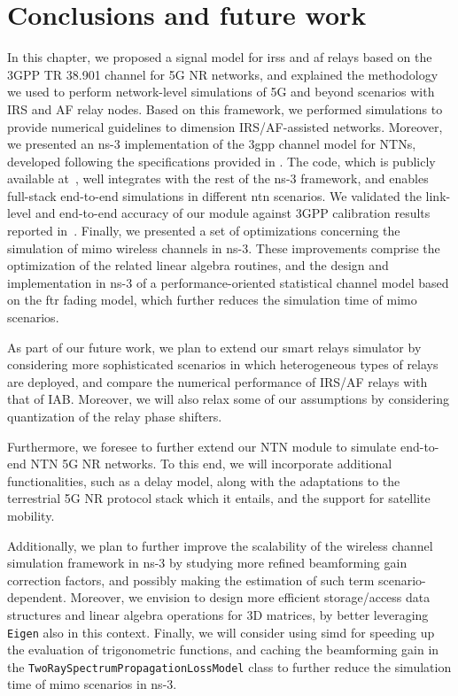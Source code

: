 \section{Conclusions and future work}
\label{sec:conc}

In this chapter, we proposed a signal model for \glspl{irs} and \gls{af} relays based on the 3GPP TR 38.901 channel for 5G NR networks, and explained the methodology we used to perform network-level simulations of 5G and beyond scenarios with IRS and AF relay nodes.
Based on this framework, we performed simulations to provide numerical guidelines to dimension IRS/AF-assisted networks. 
Moreover, we presented an ns-3 implementation of the \gls{3gpp} channel model for NTNs, developed following the specifications provided in \cite{38811}. The code, which is publicly available at~\cite{ntngitlab}, well integrates with the rest of the ns-3 framework, and enables full-stack end-to-end simulations in different \gls{ntn} scenarios. We validated the link-level and end-to-end accuracy of our module against 3GPP calibration results reported in~\cite{38821}. 
Finally, we presented a set of optimizations concerning the simulation of \gls{mimo} wireless channels in ns-3. These improvements comprise the optimization of the related linear algebra routines, and the design and implementation in ns-3 of a performance-oriented statistical channel model based on the \gls{ftr} fading model, which further reduces the simulation time of \gls{mimo} scenarios. %


As part of our future work, we plan to extend our smart relays simulator by considering more sophisticated
scenarios in which heterogeneous types of relays are deployed, and compare the numerical performance of
IRS/AF relays with that of IAB. Moreover, we will also relax some of our assumptions by considering quantization of the
relay phase shifters.

Furthermore, we foresee to further extend our NTN module to simulate end-to-end NTN 5G NR networks. To this end, we will incorporate additional functionalities, such as a delay model, along with the adaptations to the terrestrial 5G NR protocol stack which it entails, and the support for satellite mobility.

Additionally, we plan to further improve the scalability of the wireless channel simulation framework in ns-3 by studying more refined beamforming gain correction factors, and possibly making the estimation of such term scenario-dependent. Moreover, we envision to design more efficient storage/access data structures and linear algebra operations for 3D matrices, by better leveraging \texttt{Eigen} also in this context.
Finally, we will consider using \gls{simd} for speeding up the evaluation of trigonometric functions, and caching the beamforming gain in the \texttt{Two\-Ray\-Spectrum\-Propagation\-Loss\-Model} class to further reduce the simulation time of \gls{mimo} scenarios in ns-3.

